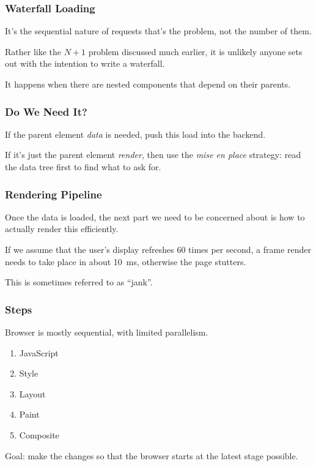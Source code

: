 \begin{frame}
\frametitle{Waterfall Loading}

It's the sequential nature of requests that's the problem, not the number of them.

Rather like the $N+1$ problem discussed much earlier, it is unlikely anyone sets out with the intention to write a waterfall.

It happens when there are nested components that depend on their parents.

\end{frame}


\begin{frame}
\frametitle{Do We Need It?}

If the parent element \textit{data} is needed, push this load into the backend.

If it's just the parent element \textit{render}, then use the \textit{mise en place} strategy: read the data tree first to find what to ask for.

\end{frame}


\begin{frame}
\frametitle{Rendering Pipeline}
Once the data is loaded, the next part we need to be concerned about is how to actually render this efficiently. 

If we assume that the user's display refreshes 60 times per second, a frame render needs to take place in about 10~ms, otherwise the page stutters.

This is sometimes referred to as ``jank''.

\end{frame}


\begin{frame}
\frametitle{Steps}

Browser is mostly sequential, with limited parallelism.

\begin{enumerate}
	\item JavaScript
	\item Style
	\item Layout
	\item Paint
	\item Composite
\end{enumerate}

Goal: make the changes so that the browser starts at the latest stage possible.

\end{frame}


